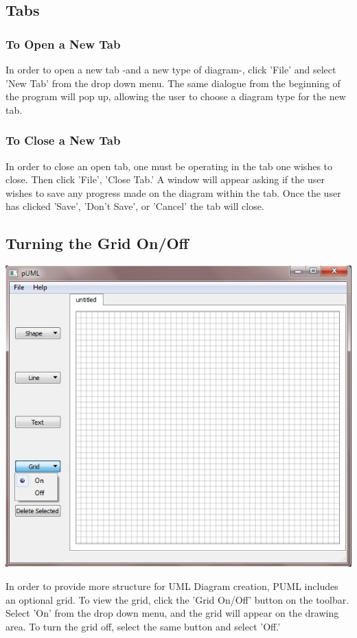 \documentclass[]{article}
\begin{document}
\subsection{Tabs}
\subsubsection{To Open a New Tab}
{\color{black}
In order to open a new tab -and a new type of diagram-, click 'File' and select 'New Tab' from the drop down menu. The same dialogue from the beginning of the program will pop up, allowing the user to choose a diagram type for the new tab. 
}
\subsubsection{To Close a New Tab}
{\color{black}
In order to close an open tab, one must be operating in the tab one wishes to close. Then click 'File', 'Close Tab.' A window will appear asking if the user wishes to save any progress made on the diagram within the tab. Once the user has clicked 'Save', 'Don't Save', or 'Cancel' the tab will close.
}
\subsection{Turning the Grid On/Off}
{\color{black}
\includegraphics[scale = .50]{Gridonoff}

In order to provide more structure for UML Diagram creation, PUML includes an optional grid. To view the grid, click the 'Grid On/Off' button on the toolbar. Select 'On' from the drop down menu, and the grid will appear on the drawing area. To turn the grid off, select the same button and select 'Off.'
}
\end{document}
